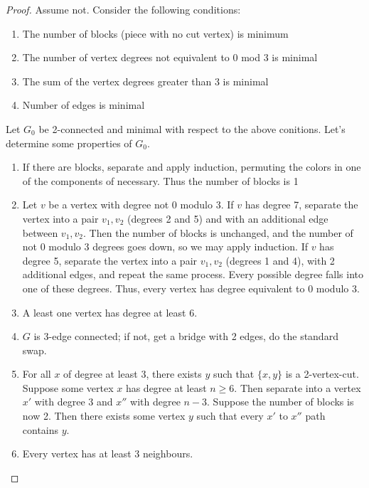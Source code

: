 \documentclass[11pt, a4paper]{memoir}
\theoremstyle{change}
\theoremstyle{plain}
\theoremstyle{nonumberplain}
\newtheorem{proof}{Proof}
\numberwithin{equation}{section}
\begin{document}
\begin{proof}
    Assume not.
    Consider the following conditions:
    \begin{enumerate}[nl,r]
        \item The number of blocks (piece with no cut vertex) is minimum
        \item The number of vertex degrees not equivalent to 0 mod 3 is minimal
        \item The sum of the vertex degrees greater than 3 is minimal
        \item Number of edges is minimal
    \end{enumerate}

    Let $G_0$ be 2-connected and minimal with respect to the above conitions.
    Let's determine some properties of $G_0$.
    \begin{enumerate}[nl]
        \item If there are blocks, separate and apply induction, permuting the colors in one of the components of necessary.
            Thus the number of blocks is 1
        \item Let $v$ be a vertex with degree not 0 modulo 3.
            If $v$ has degree 7, separate the vertex into a pair $v_1,v_2$ (degrees 2 and 5) and with an additional edge between $v_1,v_2$.
            Then the number of blocks is unchanged, and the number of not 0 modulo 3 degrees goes down, so we may apply induction.
            If $v$ has degree 5, separate the vertex into a pair $v_1,v_2$ (degrees 1 and 4), with 2 additional edges, and repeat the same process.
            Every possible degree falls into one of these degrees.
            Thus, every vertex has degree equivalent to 0 modulo 3.
        \item A least one vertex has degree at least 6.
        \item $G$ is 3-edge connected; if not, get a bridge with 2 edges, do the standard swap.
        \item For all $x$ of degree at least 3, there exists $y$ such that $\{x,y\}$ is a 2-vertex-cut.
            Suppose some vertex $x$ has degree at least $n\geq 6$.
            Then separate into a vertex $x'$ with degree 3 and $x''$ with degree $n-3$.
            Suppose the number of blocks is now 2.
            Then there exists some vertex $y$ such that every $x'$ to $x''$ path contains $y$.
        \item Every vertex has at least 3 neighbours.
    \end{enumerate}
\end{proof}
\end{document}

